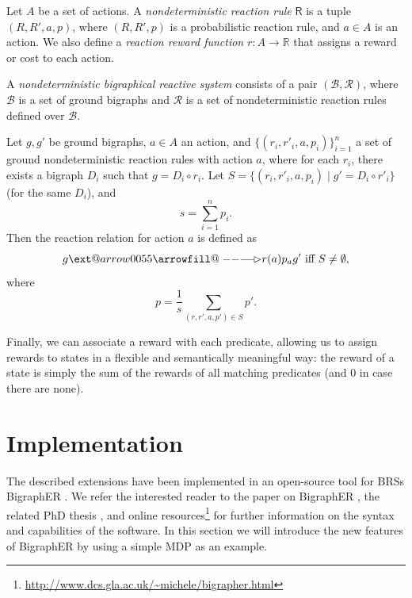 \documentclass[runningheads]{llncs}
\makeatletter
\providecommand\longrightarrowrhd{\relbar\joinrel\relbar\joinrel\mathrel\rhd}
\providecommand*\xrightarrowrhd[2][]{\ext@arrow 0055{\arrowfill@\relbar\relbar\longrightarrowrhd}{#1}{#2}}
\makeatother
\begin{document}
\begin{definition}
  Let $A$ be a set of actions. A \emph{nondeterministic reaction rule}
  $\mathsf{R}$ is a tuple $(R, R', a, p)$, where $(R, R', p)$ is a probabilistic
  reaction rule, and $a \in A$ is an action. We also define a \emph{reaction
    reward function} $r : A \to \mathbb{R}$ that assigns a reward or cost to
  each action.
\end{definition}

\begin{definition}
  A \emph{nondeterministic bigraphical reactive system} consists of a pair
  $(\mathcal{B}, \mathcal{R})$, where $\mathcal{B}$ is a set of ground bigraphs
  and $\mathcal{R}$ is a set of nondeterministic reaction rules defined over
  $\mathcal{B}$.

  Let $g, g'$ be ground bigraphs, $a \in A$ an action, and $\{ (r_i, r'_i, a,
  p_i) \}_{i=1}^n$ a set of ground nondeterministic reaction rules with action
  $a$, where for each $r_i$, there exists a bigraph $D_i$ such that $g =
  D_i \circ r_i$. Let $S = \{ (r_i, r'_i, a, p_i) \mid g' = D_i \circ r'_i \}$
  (for the same $D_i$), and
  \[ s = \sum_{i=1}^n p_i. \]
  Then the reaction relation for action $a$ is defined as
  \[ g \xrightarrowrhd[r(a)]{p}_{a} g' \text{ iff } S \ne \emptyset, \]
  where
  \[ p = \frac{1}{s}\sum_{(r, r', a, p') \in S} p'. \]
\end{definition}

Finally, we can associate a reward with each predicate, allowing us to assign
rewards to states in a flexible and semantically meaningful way: the reward of a
state is simply the sum of the rewards of all matching predicates (and $0$ in
case there are none).

\section{Implementation}

The described extensions have been implemented in an open-source tool for BRSs
BigraphER \cite{DBLP:conf/cav/SevegnaniC16}. We refer the interested reader to
the paper on BigraphER \cite{DBLP:conf/cav/SevegnaniC16}, the related PhD thesis
\cite{DBLP:phd/ethos/Sevegnani12}, and online
resources\footnote{\url{http://www.dcs.gla.ac.uk/~michele/bigrapher.html}} for
further information on the syntax and capabilities of the software. In this
section we will introduce the new features of BigraphER by using a simple MDP as
an example.
\end{document}
